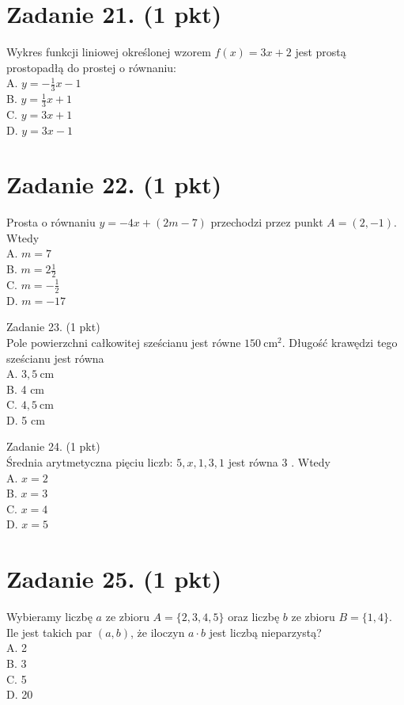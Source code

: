 \documentclass[10pt]{article}
\begin{document}
\section*{Zadanie 21. (1 pkt)}
Wykres funkcji liniowej określonej wzorem \(f(x)=3 x+2\) jest prostą prostopadłą do prostej o równaniu:\\
A. \(y=-\frac{1}{3} x-1\)\\
B. \(y=\frac{1}{3} x+1\)\\
C. \(y=3 x+1\)\\
D. \(y=3 x-1\)

\section*{Zadanie 22. (1 pkt)}
Prosta o równaniu \(y=-4 x+(2 m-7)\) przechodzi przez punkt \(A=(2,-1)\). Wtedy\\
A. \(m=7\)\\
B. \(m=2 \frac{1}{2}\)\\
C. \(m=-\frac{1}{2}\)\\
D. \(m=-17\)

Zadanie 23. (1 pkt)\\
Pole powierzchni całkowitej sześcianu jest równe \(150 \mathrm{~cm}^{2}\). Długość krawędzi tego sześcianu jest równa\\
A. \(3,5 \mathrm{~cm}\)\\
B. 4 cm\\
C. \(4,5 \mathrm{~cm}\)\\
D. 5 cm

Zadanie 24. (1 pkt)\\
Średnia arytmetyczna pięciu liczb: \(5, x, 1,3,1\) jest równa 3 . Wtedy\\
A. \(x=2\)\\
B. \(x=3\)\\
C. \(x=4\)\\
D. \(x=5\)

\section*{Zadanie 25. (1 pkt)}
Wybieramy liczbę \(a\) ze zbioru \(A=\{2,3,4,5\}\) oraz liczbę \(b\) ze zbioru \(B=\{1,4\}\). Ile jest takich par \((a, b)\), że iloczyn \(a \cdot b\) jest liczbą nieparzystą?\\
A. 2\\
B. 3\\
C. 5\\
D. 20
\end{document}
